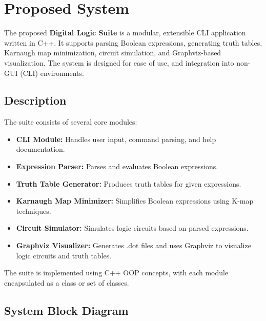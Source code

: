 \section{Proposed System}
The proposed \textbf{Digital Logic Suite} is a modular, extensible CLI application written in C++. It supports parsing Boolean expressions, generating truth tables, Karnaugh map minimization, circuit simulation, and Graphviz-based visualization. The system is designed for ease of use, and integration into non-GUI (CLI) environments.

\vspace{0.5em}

\subsection{Description}
The suite consists of several core modules:
\begin{itemize}
    \item \textbf{CLI Module:} Handles user input, command parsing, and help documentation.
    \item \textbf{Expression Parser:} Parses and evaluates Boolean expressions.
    \item \textbf{Truth Table Generator:} Produces truth tables for given expressions.
    \item \textbf{Karnaugh Map Minimizer:} Simplifies Boolean expressions using K-map techniques.
    \item \textbf{Circuit Simulator:} Simulates logic circuits based on parsed expressions.
    \item \textbf{Graphviz Visualizer:} Generates .dot files and uses Graphviz to visualize logic circuits and truth tables.
\end{itemize}
The suite is implemented using C++ OOP concepts, with each module encapsulated as a class or set of classes.

\vspace{0.5em}

\subsection{System Block Diagram}
